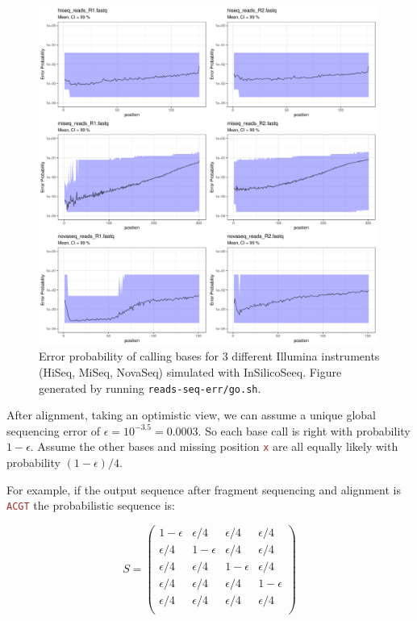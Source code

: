 \documentclass[12pt]{article}
\newcommand{\sq}[1]{\texttt{\textcolor{brown}{#1}}}
\begin{document}
\begin{figure}[ht]
\begin{center}
 \includegraphics[width = 0.99\textwidth]{figs/plot-errorProba.pdf}
\caption{Error probability of calling bases for 3 different Illumina instruments (HiSeq, MiSeq, NovaSeq) simulated with \textsf{InSilicoSeeq}. Figure generated by running \texttt{reads-seq-err/go.sh}.}
\label{fig:probaErrISS}
\end{center}
\end{figure}

After alignment, taking an optimistic view, we can assume a unique global sequencing error of $\epsilon=10^{-3.5}=0.0003$.
So each base call is right with probability $1-\epsilon$. Assume the other bases and missing position \sq{x} are all equally likely with probability $(1-\epsilon)/4$. 

For example, if the output sequence after fragment sequencing and alignment is \sq{ACGT} the probabilistic sequence is:

$$
S = 
\begin{pmatrix}
1-\epsilon & \epsilon/4    & \epsilon/4  & \epsilon/4  \\
\epsilon/4 & 1-\epsilon & \epsilon/4  & \epsilon/4  \\
\epsilon/4 & \epsilon/4  & 1-\epsilon  & \epsilon/4 \\
\epsilon/4 & \epsilon/4  & \epsilon/4  & 1-\epsilon \\
\epsilon/4 & \epsilon/4  & \epsilon/4  & \epsilon/4 \\
\end{pmatrix}
$$
\end{document}
